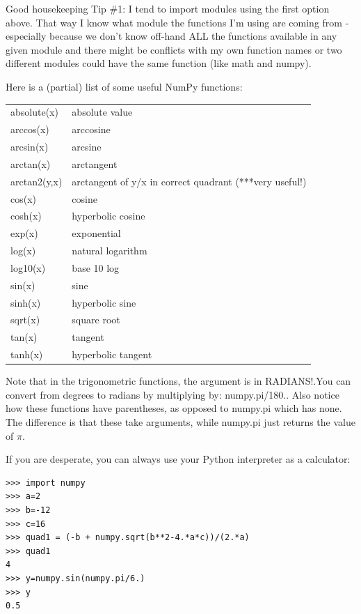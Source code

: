 \documentclass[11pt]{book}
\begin{document}
{{{\color{magenta}Good housekeeping Tip \#1:  I tend to import modules using the first option above.  That way  I know what module the functions I'm using are coming from - especially because we don't know off-hand ALL the functions available in any given module and there might be conflicts with my own function names or two different modules could have the same function (like} {\color{blue}math} {\color{magenta}and }{\color{blue}numpy}).  


Here is a (partial) list of some useful {\color{blue}NumPy} functions:


\begin{tabular}{ll}
\hline
absolute(x)  \qquad & absolute value\\
arccos(x)    \qquad & arccosine\\
arcsin(x)    \qquad & arcsine\\
arctan(x)    \qquad & arctangent\\
arctan2(y,x)  \qquad &arctangent of y/x in correct quadrant (***very useful!)\\
cos(x)        \qquad &cosine\\
cosh(x)      \qquad & hyperbolic cosine\\
exp(x)      \qquad &  exponential\\
log(x)      \qquad &  natural logarithm\\
log10(x)    \qquad &  base 10 log\\
sin(x)       \qquad & sine\\
sinh(x)     \qquad &  hyperbolic sine\\
sqrt(x)    \qquad &   square root\\
tan(x)      \qquad &  tangent\\
tanh(x)    \qquad &   hyperbolic tangent\\
\hline
\end{tabular}

\noindent 
Note that  in the trigonometric functions,  the argument is in RADIANS!.You can convert from degrees to radians by multiplying by:  {\color{blue}numpy.pi/180.}.  Also notice how these functions have parentheses, as opposed to {\color{blue}numpy.pi} which has none.  The difference is that these take arguments, while  {\color{blue}numpy.pi} just returns the value of $\pi$.  


\noindent 
If you are desperate, you can always use your Python interpreter as a calculator:

{ \color{blue} \begin{verbatim}
>>> import numpy
>>> a=2
>>> b=-12
>>> c=16
>>> quad1 = (-b + numpy.sqrt(b**2-4.*a*c))/(2.*a)
>>> quad1
4
>>> y=numpy.sin(numpy.pi/6.)
>>> y
0.5
\end{verbatim}}


}}
\end{document}
